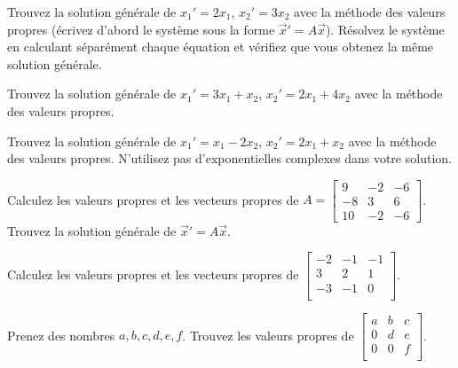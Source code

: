 \begin{exercise}
\leavevmode
\begin{tasks}
\task
Trouvez la solution générale de $x_1' = 2 x_1$, $x_2' = 3 x_2$ avec la méthode des valeurs propres (écrivez d'abord le système sous la forme
${\vec{x}}' = A \vec{x}$).
\task
Résolvez le système en calculant séparément chaque équation et vérifiez que vous obtenez la même solution générale.
\end{tasks}
\end{exercise}

\begin{exercise}
Trouvez la solution générale de $x_1' = 3 x_1 + x_2$,
$x_2' = 2 x_1 + 4 x_2$ avec la méthode des valeurs propres.
\end{exercise}

\begin{exercise}
Trouvez la solution générale de $x_1' = x_1 -2 x_2$,
$x_2' = 2 x_1 + x_2$ avec la méthode des valeurs propres. N'utilisez pas d'exponentielles complexes dans votre solution.
\end{exercise}

\begin{exercise}
\leavevmode
\begin{tasks}
\task
Calculez les valeurs propres et les vecteurs propres de
$A = \left[ \begin{smallmatrix}
9 & -2 & -6 \\
-8 & 3 & 6 \\
10 & -2 & -6
\end{smallmatrix} \right]$.
\task
Trouvez la solution générale de ${\vec{x}}' = A \vec{x}$.
\end{tasks}
\end{exercise}

\begin{exercise}
Calculez les valeurs propres et les vecteurs propres de
$\left[ \begin{smallmatrix}
-2 & -1 & -1 \\
3 & 2 & 1 \\
-3 & -1 & 0 \\
\end{smallmatrix} \right]$.
\end{exercise}

\begin{exercise}
Prenez des nombres $a,b,c,d,e,f$. Trouvez les valeurs propres de
$\left[ \begin{smallmatrix}
a & b & c \\
0 & d & e \\
0 & 0 & f \\
\end{smallmatrix} \right]$.
\end{exercise}

